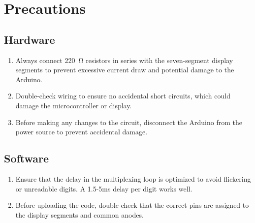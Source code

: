 \documentclass[journal]{IEEEtran}
\begin{document}
\section{Precautions}

\subsection{Hardware}
\begin{enumerate}
    \item  Always connect \SI{220}{\ohm} resistors in series with the seven-segment display segments to prevent excessive current draw and potential damage to the Arduino.
    \item  Double-check wiring to ensure no accidental short circuits, which could damage the microcontroller or display.
    \item  Before making any changes to the circuit, disconnect the Arduino from the power source to prevent accidental damage.
\end{enumerate}

\subsection{Software}
\begin{enumerate}
    \item  Ensure that the delay in the multiplexing loop is optimized to avoid flickering or unreadable digits. A 1.5-5ms delay per digit works well.
    \item Before uploading the code, double-check that the correct pins are assigned to the display segments and common anodes.
\end{enumerate}
\end{document}
